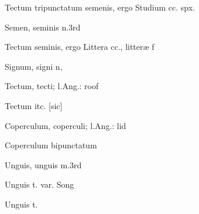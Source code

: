  {\mktsStyleItalic{}Tectum tripunctatum semenis\/}, ergo {\mktsStyleItalic{}Studium cc. spx.\/}


 {\mktsStyleItalic{}Semen\/}, seminis {\mktsStyleItalic{}n.3rd\/}


 {\mktsStyleItalic{}Tectum seminis\/}, ergo {\mktsStyleItalic{}Littera cc.\/}, litteræ {\mktsStyleItalic{}f\/}


 {\mktsStyleItalic{}Signum\/}, signi {\mktsStyleItalic{}n\/},


 {\mktsStyleItalic{}Tectum\/}, tecti; l.Ang.: roof


 {\mktsStyleItalic{}Tectum itc.\/} [sic]


 {\mktsStyleItalic{}Coperculum\/}, coperculi; l.Ang.: lid




 {\mktsStyleItalic{}Coperculum bipunctatum\/}


 {\mktsStyleItalic{}Unguis\/}, unguis {\mktsStyleItalic{}m.3rd\/}


 {\mktsStyleItalic{}Unguis t.\/} var. {\mktsStyleItalic{}Song\/}


 {\mktsStyleItalic{}Unguis t.\/}




